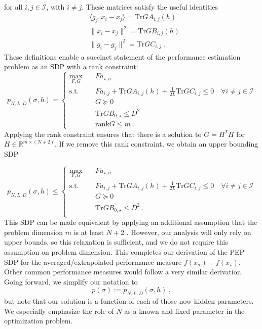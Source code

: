 \documentclass[11pt]{article}
\numberwithin{equation}{section}
\newcommand{\R}{\mathbb{R}}
\newcommand{\Tr}{\text{Tr}}
\theoremstyle{definition}
\theoremstyle{definition}
\theoremstyle{definition}
\newcommand{\1}{\mathbf{1}}
\newcommand{\xStar}{x_\star}
\newcommand{\xSpecial}{x_\sigma}
\newcommand{\idxSpecial}{\sigma}
\newcommand{\dimension}{m}
\begin{document}
for all $i,j \in \mathcal{I}$, with $i\neq j$.
These matrices satisfy the useful identities
\begin{align*}
        &\langle g_j, x_i-x_j \rangle = \Tr GA_{i,j}(h)\\
        &\|x_i-x_j\|^2=\Tr GB_{i,j}(h)\\
        &\|g_i-g_j\|^2=\Tr GC_{i,j} \ .
\end{align*}
These definitions enable a succinct statement of the performance estimation problem as an SDP with a rank constraint:
\begin{equation}
    p_{N,L,D}(\sigma,h) = \begin{cases} \max_{F,G} \quad & F a_{\star,\idxSpecial} \\
                    \text{s.t. } & Fa_{i,j}+\Tr G A_{i,j}(h) + \frac{1}{2L}\Tr G C_{i,j} \leq 0   \quad \forall i\neq j \in \mathcal{I}\\
                    & G \succeq 0 \\
                    & \Tr G B_{0,\star} \leq D^2  \\
                    & \mathrm{rank} G \leq \dimension \ .
                \end{cases}
\end{equation}
Applying the rank constraint ensures that there is a solution to $G = H^T H$ for $H \in \R^{\dimension \times (N+2)}$. If we remove this rank constraint, we obtain an upper bounding SDP


\begin{equation}\label{Eqn:primal}
    p_{N,L,D}(\sigma,h) \leq \begin{cases} \max_{F,G} \quad & F a_{\star,\idxSpecial} \\
                    \text{s.t. } & Fa_{i,j}+\Tr G A_{i,j}(h) + \frac{1}{2L}\Tr G C_{i,j} \leq 0   \quad \forall i\neq j \in \mathcal{I}\\
                    & G \succeq 0 \\
                    & \Tr G B_{0,\star} \leq D^2 \ . \\
                \end{cases}
\end{equation}
This SDP can be made equivalent by applying an additional assumption that the problem dimension $\dimension$ is at least $N+2$ \cite{Interpolation}. However, our analysis will only rely on upper bounds, so this relaxation is sufficient, and we do not require this assumption on problem dimension. This completes our derivation of the PEP SDP for the averaged/extrapolated performance measure $f(\xSpecial)-f(\xStar)$. Other common performance measures would follow a very similar derivation. Going forward, we simplify our notation to
\begin{equation}
p(\sigma) := p_{N,L,D}(\sigma,h) \ ,
\end{equation}
but note that our solution is a function of each of those now hidden parameters. We especially emphasize the role of $N$ as a known and fixed parameter in the optimization problem.
\end{document}
